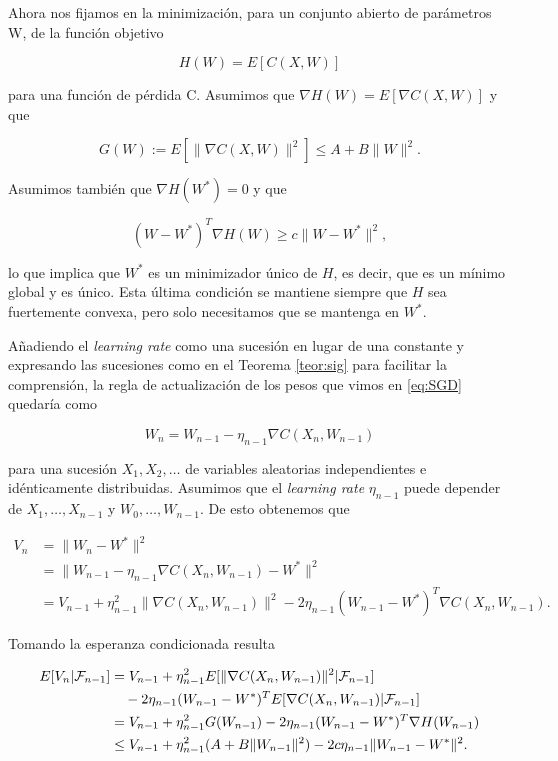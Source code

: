 Ahora nos fijamos en la minimización, para un conjunto abierto de parámetros W, de la función objetivo

\begin{equation*}
	H(W) = E[ C(X,W)]
\end{equation*}

para una función de pérdida C. Asumimos que $\nabla H(W) = E[\nabla C(X, W)]$ y que 

\begin{equation*}
	G(W):= E[ \| \nabla C(X,W)\|^2] \leq A + B\|W\|^2.
\end{equation*}

Asumimos también que $\nabla H(W^*)=0$ y que

\begin{equation*}
	(W-W^*)^T \nabla H(W) \geq c \|W - W^*\|^2,
\end{equation*}

lo que implica que $W^*$ es un minimizador único de $H$, es decir, que es un mínimo global y es único. Esta última condición se mantiene siempre que $H$ sea fuertemente convexa, pero solo necesitamos que se mantenga en $W^*$.

Añadiendo el \textit{learning rate} como una sucesión en lugar de una constante y expresando las sucesiones como en el Teorema \ref{teor:sig} para facilitar la comprensión, la regla de actualización de los pesos que vimos en \eqref{eq:SGD} quedaría como

\begin{equation*}
W_{n} = W_{n-1} - \eta_{n-1} \nabla C(X_n, W_{n-1})
\end{equation*} 

para una sucesión $X_1, X_2, \ldots$ de variables aleatorias independientes e idénticamente distribuidas. Asumimos que el \textit{learning rate} $\eta_{n-1}$ puede depender de $X_1, \ldots, X_{n-1}$ y $W_0, \ldots, W_{n-1}$. De esto obtenemos que 

\begin{align*}
	V_{n} &= \| W_{n} - W^* \|^2 \\
	       &= \| W_{n-1} - \eta_{n-1} \nabla C(X_{n}, W_{n-1}) - W^* \|^2 \\
	       &= V_{n-1} + \eta^2_{n-1} \|\nabla C(X_n, W_{n-1}) \|^2 - 2\eta_{n-1}(W_{n-1} - W^*)^T \nabla C(X_n, W_{n-1}).
\end{align*}

Tomando la esperanza condicionada resulta

\begin{align}
	E[V_n | \mathcal{F}_{n-1}] &= V_{n-1} + \eta^2_{n-1} E[ \| \nabla C(X_n, W_{n-1}) \|^2 | \mathcal{F}_{n-1}] \notag \\
	& \quad - 2\eta_{n-1}(W_{n-1} - W^*)^T E[ \nabla C(X_n, W_{n-1}) | \mathcal{F}_{n-1}] \notag \\  
	&= V_{n-1} + \eta^2_{n-1} G(W_{n-1}) - 2 \eta_{n-1}(W_{n-1} - W^*)^T \nabla H(W_{n-1}) \notag \\
	&\leq V_{n-1} + \eta^2_{n-1} (A+B \|W_{n-1} \|^2) - 2c \eta_{n-1} \|W_{n-1} - W^*\|^2. \label{eq:sig1}
\end{align}

